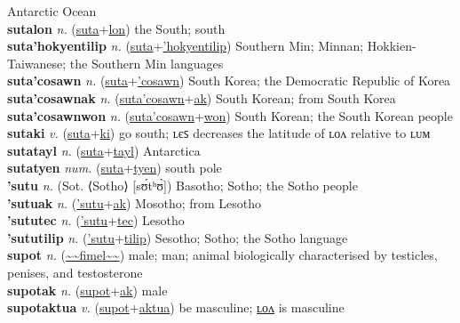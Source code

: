 Antarctic Ocean \label{sutalawt} \\
\textbf{sutalon} \textit{n.} (\hyperref[suta]{suta}+\hyperref[lon]{lon})
the South; south \label{sutalon} \\
\textbf{suta'hokyentilip} \textit{n.} (\hyperref[suta]{suta}+\hyperref['hokyentilip]{'hokyentilip})
Southern Min; Minnan; Hokkien-Taiwanese; the Southern Min languages \label{suta'hokyentilip} \\
\textbf{suta'cosawn} \textit{n.} (\hyperref[suta]{suta}+\hyperref['cosawn]{'cosawn})
South Korea; the Democratic Republic of Korea \label{suta'cosawn} \\
\textbf{suta'cosawnak} \textit{n.} (\hyperref[suta'cosawn]{suta'cosawn}+\hyperref[ak]{ak})
South Korean; from South Korea \label{suta'cosawnak} \\
\textbf{suta'cosawnwon} \textit{n.} (\hyperref[suta'cosawn]{suta'cosawn}+\hyperref[won]{won})
South Korean; the South Korean people \label{suta'cosawnwon} \\
\textbf{sutaki} \textit{v.} (\hyperref[suta]{suta}+\hyperref[ki]{ki})
go south; ʟєꜱ decreases the latitude of ʟᴏᴧ relative to ʟᴜᴍ \label{sutaki} \\
\textbf{sutatayl} \textit{n.} (\hyperref[suta]{suta}+\hyperref[tayl]{tayl})
Antarctica \label{sutatayl} \\
\textbf{sutatyen} \textit{num.} (\hyperref[suta]{suta}+\hyperref[tyen]{tyen})
south pole \label{sutatyen} \\
\textbf{'sutu} \textit{n.} (Sot. ⟨Sotho⟩ [sʊ́tʰʊ̀])
Basotho; Sotho; the Sotho people \label{'sutu} \\
\textbf{'sutuak} \textit{n.} (\hyperref['sutu]{'sutu}+\hyperref[ak]{ak})
Mosotho; from Lesotho \label{'sutuak} \\
\textbf{'sututec} \textit{n.} (\hyperref['sutu]{'sutu}+\hyperref[tec]{tec})
Lesotho \label{'sututec} \\
\textbf{'sututilip} \textit{n.} (\hyperref['sutu]{'sutu}+\hyperref[tilip]{tilip})
Sesotho; Sotho; the Sotho language \label{'sututilip} \\
\textbf{supot} \textit{n.} (\hyperref[fimel]{\~{}\~{}fimel\~{}\~{}})
male; man; animal biologically characterised by testicles, penises, and testosterone \label{supot} \\
\textbf{supotak} \textit{n.} (\hyperref[supot]{supot}+\hyperref[ak]{ak})
male \label{supotak} \\
\textbf{supotaktua} \textit{v.} (\hyperref[supot]{supot}+\hyperref[aktua]{aktua})
be masculine; \hyperref[supotaktualon]{ʟᴏᴧ} is masculine \label{supotaktua} \\
